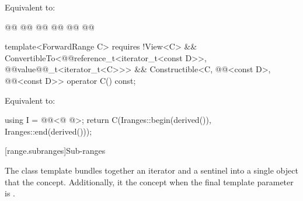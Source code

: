 {\begin{itemdescr}
\pnum
{}

\pnum
\effects Equivalent to: 
\end{itemdescr}

%
\begin{itemdecl}
@@
  @@
@@
@@
  @@
@@
\end{itemdecl}

\begin{itemdescr}
\pnum
{}

\pnum
{}
\end{itemdescr}

%
\begin{itemdecl}
template<ForwardRange C>
  requires !View<C> &&
    ConvertibleTo<@@reference_t<iterator_t<const D>>,
      @@value@@_t<iterator_t<C>>> &&
    Constructible<C, @@<const D>,
      @@<const D>>
operator C() const;
\end{itemdecl}

\begin{itemdescr}
\pnum
\effects Equivalent to:
\begin{codeblock}
using I = @@<@ @>;
return C(I{ranges::begin(derived())}, I{ranges::end(derived())});
\end{codeblock}
\end{itemdescr}


[range.subranges]{Sub-ranges}

\pnum
The  class template bundles together an
iterator and a sentinel into a single object that   the
 concept. Additionally, it   the
 concept when the final template parameter is
.

}
